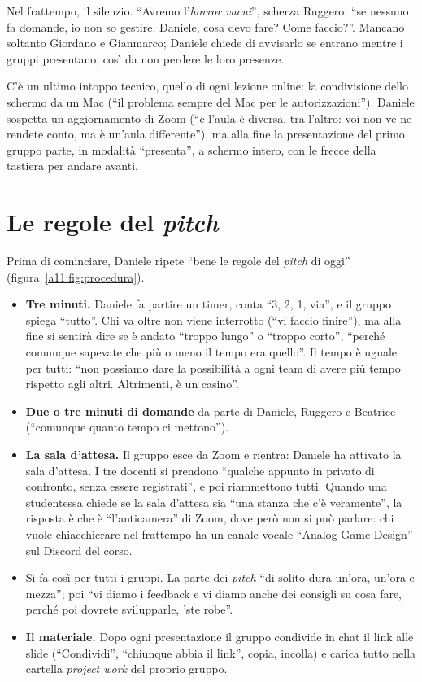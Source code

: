 Nel frattempo, il silenzio. ``Avremo l'\emph{horror vacui}'', scherza Ruggero: ``se
nessuno fa domande, io non so gestire. Daniele, cosa devo fare? Come faccio?''. Mancano
soltanto Giordano e Gianmarco; Daniele chiede di avvisarlo se entrano mentre i gruppi
presentano, così da non perdere le loro presenze.

C'è un ultimo intoppo tecnico, quello di ogni lezione online: la condivisione dello
schermo da un Mac (``il problema sempre del Mac per le autorizzazioni''). Daniele
sospetta un aggiornamento di Zoom (``e l'aula è diversa, tra l'altro: voi non ve ne
rendete conto, ma è un'aula differente''), ma alla fine la presentazione del primo
gruppo parte, in modalità ``presenta'', a schermo intero, con le frecce della tastiera
per andare avanti.

\section{Le regole del \emph{pitch}}
\label{a11:sec:regole}

Prima di cominciare, Daniele ripete ``bene le regole del \emph{pitch} di oggi''
(figura~\ref{a11:fig:procedura}).

\begin{itemize}
  \item \textbf{Tre minuti.} Daniele fa partire un timer, conta ``3, 2, 1, via'', e il
        gruppo spiega ``tutto''. Chi va oltre non viene interrotto (``vi faccio
        finire''), ma alla fine si sentirà dire se è andato ``troppo lungo'' o ``troppo
        corto'', ``perché comunque sapevate che più o meno il tempo era quello''. Il
        tempo è uguale per tutti: ``non possiamo dare la possibilità a ogni team di
        avere più tempo rispetto agli altri. Altrimenti, è un casino''.
  \item \textbf{Due o tre minuti di domande} da parte di Daniele, Ruggero e Beatrice
        (``comunque quanto tempo ci mettono'').
  \item \textbf{La sala d'attesa.} Il gruppo esce da Zoom e rientra: Daniele ha
        attivato la sala d'attesa. I tre docenti si prendono ``qualche appunto in
        privato di confronto, senza essere registrati'', e poi riammettono tutti.
        Quando una studentessa chiede se la sala d'attesa sia ``una stanza che c'è
        veramente'', la risposta è che è ``l'anticamera'' di Zoom, dove però non si
        può parlare: chi vuole chiacchierare nel frattempo ha un canale vocale
        ``Analog Game Design'' sul Discord del corso.
  \item Si fa così per tutti i gruppi. La parte dei \emph{pitch} ``di solito dura
        un'ora, un'ora e mezza''; poi ``vi diamo i feedback e vi diamo anche dei
        consigli su cosa fare, perché poi dovrete svilupparle, 'ste robe''.
  \item \textbf{Il materiale.} Dopo ogni presentazione il gruppo condivide in chat il
        link alle slide (``Condividi'', ``chiunque abbia il link'', copia, incolla) e
        carica tutto nella cartella \emph{project work} del proprio gruppo.
\end{itemize}

